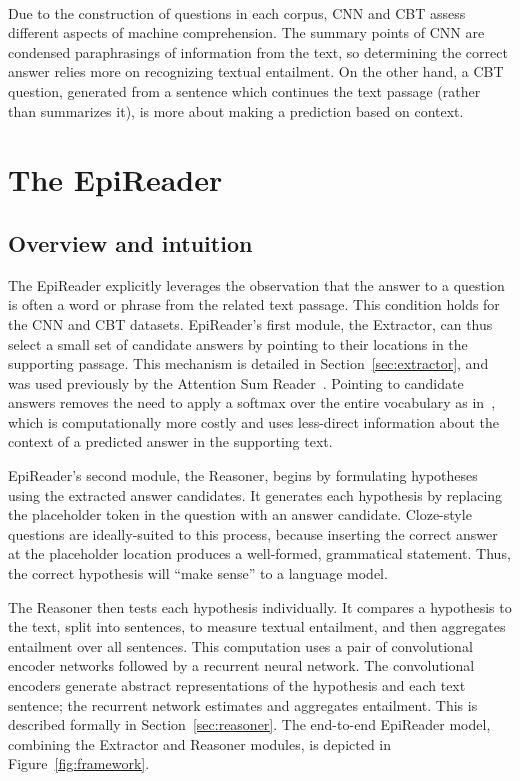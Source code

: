 \documentclass[11pt,letterpaper]{article}
\begin{document}
\paragraph{} Due to the construction of questions in each corpus, CNN and CBT assess different aspects of machine comprehension. The summary points of CNN are condensed paraphrasings of information from the text, so determining the correct answer relies more on recognizing textual entailment. On the other hand, a CBT question, generated from a sentence which continues the text passage (rather than summarizes it), is more about making a prediction based on context.

\section{The EpiReader}
\label{sec:epireader}
\subsection{Overview and intuition}
The EpiReader explicitly leverages the observation that the answer to a question is often a word or phrase from the related text passage. This condition holds for the CNN and CBT datasets. EpiReader's first module, the Extractor, can thus select a small set of candidate answers by pointing to their locations in the supporting passage. This mechanism is detailed in Section~\ref{sec:extractor}, and was used previously by the Attention Sum Reader~\cite{kadlec2016}. Pointing to candidate answers removes the need to apply a softmax over the entire vocabulary as in~, which is computationally more costly and uses less-direct information about the context of a predicted answer in the supporting text.

EpiReader's second module, the Reasoner, begins by formulating hypotheses using the extracted answer candidates. It generates each hypothesis by replacing the placeholder token in the question with an answer candidate. Cloze-style questions are ideally-suited to this process, because inserting the correct answer at the placeholder location produces a well-formed, grammatical statement. Thus, the correct hypothesis will ``make sense'' to a language model.

The Reasoner then tests each hypothesis individually. It compares a hypothesis to the text, split into sentences, to measure textual entailment, and then aggregates entailment over all sentences. This computation uses a pair of convolutional encoder networks followed by a recurrent neural network. The convolutional encoders generate abstract representations of the hypothesis and each text sentence; the recurrent network estimates and aggregates entailment. This is described formally in Section~\ref{sec:reasoner}. The end-to-end EpiReader model, combining the Extractor and Reasoner modules, is depicted in Figure~\ref{fig:framework}.
\end{document}
